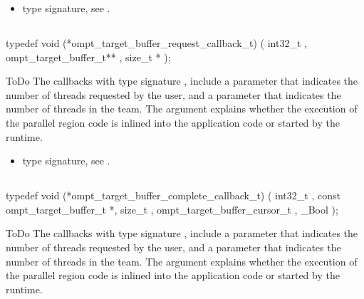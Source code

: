 \crossreferences
\begin{itemize}
\item {} type signature, see
.
\end{itemize}


\begin{targetRecord}
\subsection{}
\label{subsec:ompt_target_buffer_request_callback_t}
\format
\begin{boxedcode}
typedef void (*ompt\_target\_buffer\_request\_callback\_t) (
  int32\_t ,
  ompt\_target\_buffer\_t** ,
  size\_t *
);
\end{boxedcode}
\descr ToDo
The callbacks with type signature ,
include a parameter 
that indicates the number of threads requested by the user, and a parameter
 that indicates the number of threads in the team.
The  argument explains whether the execution of the parallel
region code is inlined into the application code or started by the runtime.

\crossreferences
\begin{itemize}
\item {} type signature, see
.
\end{itemize}



\subsection{}
\label{subsec:ompt_target_buffer_complete_callback_t}
\format
\begin{boxedcode}
typedef void (*ompt\_target\_buffer\_complete\_callback\_t) (
  int32\_t ,
  const ompt\_target\_buffer\_t *,
  size\_t ,
  ompt\_target\_buffer\_cursor\_t ,
  \_Bool 
);
\end{boxedcode}
\descr ToDo
The callbacks with type signature ,
include a parameter 
that indicates the number of threads requested by the user, and a parameter
 that indicates the number of threads in the team.
The  argument explains whether the execution of the parallel
region code is inlined into the application code or started by the runtime.


\end{targetRecord}
